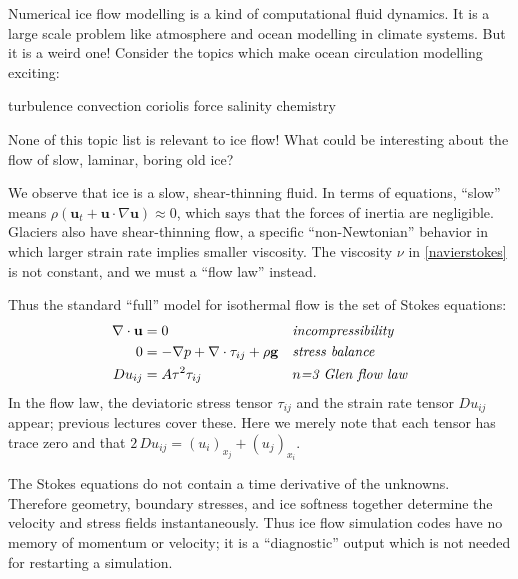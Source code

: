 \documentclass[titlepage,a4paper,final,12pt]{scrartcl}
\begin{document}
Numerical ice flow modelling is a kind of computational fluid dynamics.  It is a large scale  problem like atmosphere and ocean modelling in climate systems.  But it is a weird one!  Consider the topics which make ocean circulation modelling exciting:
  \begin{center} turbulence \qquad convection \qquad  coriolis force  \qquad salinity \qquad chemistry
  \end{center}
None of this topic list is relevant to ice flow!  What could be interesting about the flow of slow, laminar, boring old ice?

We observe that ice is a slow, shear-thinning fluid.  In terms of equations, ``slow'' means $\rho \left(\mathbf{u}_t + \mathbf{u}\cdot\nabla \mathbf{u}\right) \approx 0$, which says that the forces of inertia are negligible.  Glaciers also have shear-thinning flow, a specific ``non-Newtonian'' behavior in which larger strain rate implies smaller viscosity.  The viscosity $\nu$ in \eqref{navierstokes} is not constant, and we must a ``flow law'' instead.

Thus the standard ``full'' model for isothermal flow is the set of Stokes equations:
\begin{align}
\nabla \cdot \mathbf{u} &= 0 &&\text{\emph{incompressibility}} \label{incompressibleagain} \\
0 &= - \nabla p + \nabla \cdot \tau_{ij} + \rho \mathbf{g} &&\text{\emph{stress balance}} \label{forcebalance} \\
Du_{ij} &= A \tau^2 \tau_{ij} &&\text{\emph{$n$=3 Glen flow law}} \label{flowlaw}
\end{align}
In the flow law, the deviatoric stress tensor $\tau_{ij}$ and the strain rate tensor $Du_{ij}$ appear; previous lectures cover these.  Here we merely note that each tensor has trace zero and that $2\,Du_{ij} = (u_i)_{x_j}+(u_j)_{x_i}$.

The Stokes equations do not contain a time derivative of the unknowns.  Therefore geometry, boundary stresses, and ice softness together determine the velocity and stress fields instantaneously.  Thus ice flow simulation codes have no memory of momentum or velocity; it is a ``diagnostic'' output which is not needed for restarting a simulation.
\end{document}
